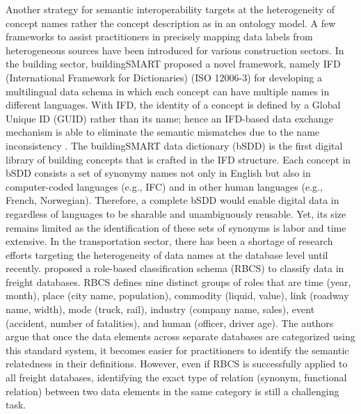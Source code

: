 \documentclass[Journal, BackFigs,NoLists, DoubleSpace]{ascelike}%
\begin{document}
\par
Another strategy for semantic interoperability targets at the heterogeneity of concept names rather the concept description as in an ontology model. A few frameworks to assist practitioners in precisely mapping data labels from heterogeneous sources have been introduced for various construction sectors. In the building sector, buildingSMART proposed a novel framework, namely IFD (International Framework for Dictionaries) (ISO 12006-3) for developing a multilingual data schema in which each concept can have multiple names in different languages. With IFD, the identity of a concept is defined by a Global Unique ID (GUID) rather than its name; hence an IFD-based data exchange mechanism is able to eliminate the semantic mismatches due to the name inconsistency \cite{IFDgroup08,hezik08}. The buildingSMART data dictionary (bSDD) \cite{buildingsmartData} is the first digital library of building concepts that is crafted in the IFD structure. Each concept in bSDD consists a set of synonymy names not only in English but also in computer-coded languages (e.g., IFC) and in other human languages (e.g., French, Norwegian). Therefore, a complete bSDD would enable digital data in regardless of languages to be sharable and unambiguously reusable. Yet, its size remains limited as the identification of these sets of synonyms is labor and time extensive. In the transportation sector, there has been a shortage of research efforts targeting the heterogeneity of data names at the database level until recently.   proposed a role-based classification schema (RBCS) to classify data in freight databases. RBCS defines nine distinct groups of roles that are time (year, month), place (city name, population), commodity (liquid, value), link (roadway name, width), mode (truck, rail), industry (company name, sales), event (accident, number of fatalities), and human (officer, driver age). The authors argue that once the data elements across separate databases are categorized using this standard system, it becomes easier for practitioners to identify the semantic relatedness in their definitions. However, even if RBCS is successfully applied to all freight databases, identifying the exact type of relation (synonym, functional relation) between two data elements in the same category is still a challenging task.
\par
\end{document}

